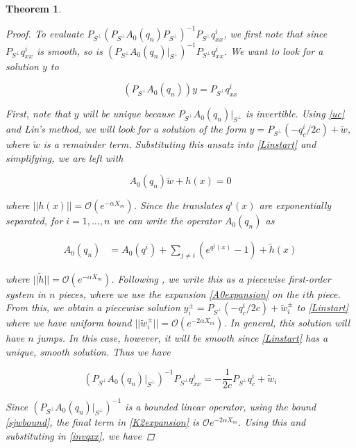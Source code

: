 \documentclass[12pt]{article}
\newtheorem{theorem}{Theorem}
\begin{document}
\begin{theorem}
\begin{proof}
To evaluate $P_{S^\perp} (P_{S^\perp} A_0(q_n) P_{S^\perp})^{-1} P_{S^\perp} q^i_{xx}$, we first note that since $P_{S^\perp} q^i_{xx}$ is smooth, so is $(P_{S^\perp} A_0(q_n)|_{S^\perp})^{-1} P_{S^\perp} q^i_{xx}$. We want to look for a solution $y$ to 

\begin{equation}\label{Linstart}
(P_{S^\perp} A_0(q_n))y = P_{S^\perp} q^i_{xx}
\end{equation}

First, note that $y$ will be unique because $P_{S^\perp} A_0(q_n)|_{S^\perp}$ is invertible. Using \eqref{uc} and Lin's method, we will look for a solution of the form $y = P_{S^\perp}(-q^i_c/2c) + \tilde{w}$, where $\tilde{w}$ is a remainder term. Substituting this ansatz into \eqref{Linstart} and simplifying, we are left with

\begin{equation}
A_0(q_n)\tilde{w} + h(x) = 0
\end{equation}

where $||h(x)|| = \mathcal{O}(e^{-\alpha X_m})$. Since the translates $q^i(x)$ are exponentially separated, for $i = 1, \dots, n$ we can write the operator $A_0(q_n)$ as 

\begin{align}\label{A0expansion} 
A_0(q_n) &= A_0(q^i) + \sum_{j \neq i} (e^{q^j(x)} - 1) + \tilde{h}(x) \nonumber
\end{align}

where $||\tilde{h}|| = \mathcal{O}(e^{-\alpha X_m})$. Following \cite{Sandstede1998}, we write this as a piecewise first-order system in $n$ pieces, where we use the expansion \eqref{A0expansion} on the $i$th piece. From this, we obtain a piecewise solution $y_i^\pm = P_{S^\perp}(-q^i_c/2c) + \tilde{w}_i^\pm$ to \eqref{Linstart} where we have uniform bound $||\tilde{w}_i^\pm|| = \mathcal{O}(e^{-2 \alpha X_m})$. In general, this solution will have $n$ jumps. In this case, however, it will be smooth since \eqref{Linstart} has a unique, smooth solution. Thus we have

\begin{equation}\label{invqxx}
(P_{S^\perp} A_0(q_n)|_{S^\perp})^{-1} P_{S^\perp} q^i_{xx} = -\frac{1}{2c}P_{S^\perp} q^i_c
+ \tilde{w}_i
\end{equation}

Since $(P_{S^\perp} A_0(q_n)|_{S^\perp})^{-1}$ is a bounded linear operator, using the bound \eqref{sjwbound}, the final term in \eqref{K2expansion} is $\mathcal{O}e^{-2 \alpha X_m}$. Using this and substituting in \eqref{invqxx}, we have


\end{proof}
\end{theorem}
\end{document}
